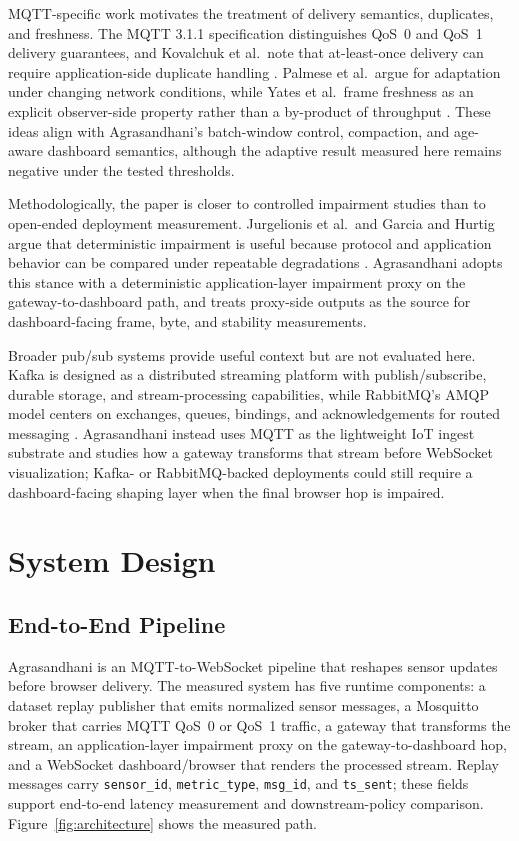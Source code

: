 \documentclass[sigconf,authorversion,nonacm]{acmart}
\begin{document}
MQTT-specific work motivates the treatment of delivery semantics, duplicates, and freshness. The MQTT 3.1.1 specification distinguishes QoS~0 and QoS~1 delivery guarantees, and Kovalchuk et al.\ note that at-least-once delivery can require application-side duplicate handling \cite{mqtt311,kovalchuk2018_mqtt_architecture_delay}. Palmese et al.\ argue for adaptation under changing network conditions, while Yates et al.\ frame freshness as an explicit observer-side property rather than a by-product of throughput \cite{palmese2022_adaptive_qos_mqttsn,yates2021_age_of_information_survey}. These ideas align with Agrasandhani's batch-window control, compaction, and age-aware dashboard semantics, although the adaptive result measured here remains negative under the tested thresholds.

Methodologically, the paper is closer to controlled impairment studies than to open-ended deployment measurement. Jurgelionis et al.\ and Garcia and Hurtig argue that deterministic impairment is useful because protocol and application behavior can be compared under repeatable degradations \cite{jurgelionis2011_netem_empirical,garcia2016_kaunetem_netdev}. Agrasandhani adopts this stance with a deterministic application-layer impairment proxy on the gateway-to-dashboard path, and treats proxy-side outputs as the source for dashboard-facing frame, byte, and stability measurements.

Broader pub/sub systems provide useful context but are not evaluated here. Kafka is designed as a distributed streaming platform with publish/subscribe, durable storage, and stream-processing capabilities, while RabbitMQ's AMQP model centers on exchanges, queues, bindings, and acknowledgements for routed messaging \cite{kafkaIntroduction,rabbitmqAmqpModel}. Agrasandhani instead uses MQTT as the lightweight IoT ingest substrate and studies how a gateway transforms that stream before WebSocket visualization; Kafka- or RabbitMQ-backed deployments could still require a dashboard-facing shaping layer when the final browser hop is impaired.

\section{System Design}

\subsection{End-to-End Pipeline}

Agrasandhani is an MQTT-to-WebSocket pipeline that reshapes sensor updates before browser delivery. The measured system has five runtime components: a dataset replay publisher that emits normalized sensor messages, a Mosquitto broker that carries MQTT QoS~0 or QoS~1 traffic, a gateway that transforms the stream, an application-layer impairment proxy on the gateway-to-dashboard hop, and a WebSocket dashboard/browser that renders the processed stream. Replay messages carry \texttt{sensor\_id}, \texttt{metric\_type}, \texttt{msg\_id}, and \texttt{ts\_sent}; these fields support end-to-end latency measurement and downstream-policy comparison. Figure~\ref{fig:architecture} shows the measured path.
\end{document}
